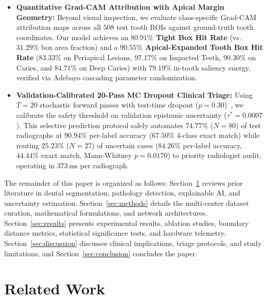 \documentclass[review]{elsarticle}
\begin{document}
\begin{itemize}
    \item \textbf{Quantitative Grad-CAM Attribution with Apical Margin Geometry:} Beyond visual inspection, we evaluate class-specific Grad-CAM~\cite{selvaraju2017gradcam} attribution maps across all $508$ test tooth ROIs against ground-truth tooth coordinates. Our model achieves an \textbf{$80.91\%$ Tight Box Hit Rate} (vs.\ $31.29\%$ box area fraction) and a \textbf{$90.55\%$ Apical-Expanded Tooth Box Hit Rate} ($83.33\%$ on Periapical Lesions, $97.17\%$ on Impacted Teeth, $90.30\%$ on Caries, and $84.71\%$ on Deep Caries) with $79.19\%$ in-tooth saliency energy, verified via Adebayo cascading parameter randomization.
    \item \textbf{Validation-Calibrated 20-Pass MC Dropout Clinical Triage:} Using $T=20$ stochastic forward passes with test-time dropout ($p=0.30$)~\cite{gal2016dropout}, we calibrate the safety threshold on validation epistemic uncertainty ($\tau^* = 0.0007$). This selective prediction protocol safely automates $74.77\%$ ($N=80$) of test radiographs at $90.94\%$ per-label accuracy ($67.50\%$ 4-class exact match) while routing $25.23\%$ ($N=27$) of uncertain cases ($84.26\%$ per-label accuracy, $44.44\%$ exact match, Mann-Whitney $p = 0.0170$) to priority radiologist audit, operating in $373$\,ms per radiograph.
\end{itemize}

The remainder of this paper is organized as follows: Section~\ref{sec:related_work} reviews prior literature in dental segmentation, pathology detection, explainable AI, and uncertainty estimation. Section~\ref{sec:methods} details the multi-center dataset curation, mathematical formulations, and network architectures. Section~\ref{sec:results} presents experimental results, ablation studies, boundary distance metrics, statistical significance tests, and hardware telemetry. Section~\ref{sec:discussion} discusses clinical implications, triage protocols, and study limitations, and Section~\ref{sec:conclusion} concludes the paper.

\section{Related Work}
\label{sec:related_work}
\end{document}

